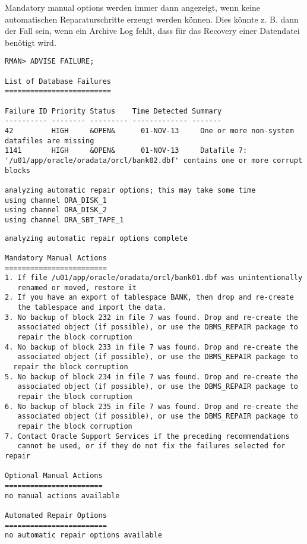         Mandatory manual options werden immer dann angezeigt, wenn keine
        automatischen Reparaturschritte erzeugt werden können. Dies könnte
        z. B. dann der Fall sein, wenn ein Archive Log fehlt, dass für das
        Recovery einer Datendatei benötigt wird.
        \begin{lstlisting}[caption={Mandatory manual options},label=admin1541,language=rman]
RMAN> ADVISE FAILURE;

List of Database Failures
=========================

Failure ID Priority Status    Time Detected Summary
---------- -------- --------- ------------- -------
42         HIGH     &OPEN&      01-NOV-13     One or more non-system
datafiles are missing
1141       HIGH     &OPEN&      01-NOV-13     Datafile 7:
'/u01/app/oracle/oradata/orcl/bank02.dbf' contains one or more corrupt blocks

analyzing automatic repair options; this may take some time
using channel ORA_DISK_1
using channel ORA_DISK_2
using channel ORA_SBT_TAPE_1
        \end{lstlisting}
\clearpage
        \begin{lstlisting}[language=rman]
analyzing automatic repair options complete

Mandatory Manual Actions
========================
1. If file /u01/app/oracle/oradata/orcl/bank01.dbf was unintentionally
   renamed or moved, restore it
2. If you have an export of tablespace BANK, then drop and re-create
   the tablespace and import the data.
3. No backup of block 232 in file 7 was found. Drop and re-create the
   associated object (if possible), or use the DBMS_REPAIR package to
   repair the block corruption
4. No backup of block 233 in file 7 was found. Drop and re-create the
   associated object (if possible), or use the DBMS_REPAIR package to
  repair the block corruption
5. No backup of block 234 in file 7 was found. Drop and re-create the
   associated object (if possible), or use the DBMS_REPAIR package to
   repair the block corruption
6. No backup of block 235 in file 7 was found. Drop and re-create the
   associated object (if possible), or use the DBMS_REPAIR package to
   repair the block corruption
7. Contact Oracle Support Services if the preceding recommendations
   cannot be used, or if they do not fix the failures selected for repair

Optional Manual Actions
=======================
no manual actions available

Automated Repair Options
========================
no automatic repair options available
        \end{lstlisting}
